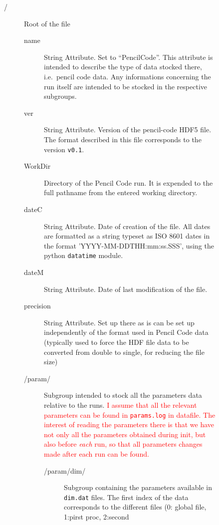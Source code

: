 \documentclass[a4paper,12pt]{article}
\newcommand{\note}[1]{\textcolor{red}{#1}}
\begin{document}
\begin{figure}[p] \centering
  \parbox{18cm}{\tiny %
    \begin{description}
    \item[/]  Root of the file
      \begin{description}
      \item[name] String Attribute. Set to ``PencilCode''. This attribute
        is intended to describe the type of data stocked there,
        i.e.\  pencil code data. Any informations concerning the run itself
    are intended to be stocked in the respective subgroups.
  \item[ver] String Attribute. Version of the
    pencil-code HDF5 file. The format described in this file
    corresponds to the version \texttt{v0.1}.
  \item[WorkDir] Directory of the Pencil Code run. It is expended to
    the full pathname from the entered working directory.
  \item[dateC] String Attribute. Date of creation of the
    file. All dates are formatted as a string typeset as ISO 8601 dates in
    the format 'YYYY-MM-DDTHH:mm:ss.SSS', using the python
    \texttt{datatime} module.
  \item[dateM] String Attribute. Date of last modification of the
    file.
  \item[precision] String Attribute. Set up there as is can be set up
    independently of the format used in Pencil Code data (typically
    used to force the HDF file data to be converted from double to
    single, for reducing the file size) 
  \item[/param/] Subgroup intended to stock all the parameters data
    relative to the runs. \note{I assume that all the relevant
      parameters can be found in \texttt{params.log} in datafile. The interest
      of reading the parameters there is that we have not only all the
      parameters obtained during init, but also before \emph{each} run,
      so that all parameters changes made after each run can be
      found.}
    \begin{description}
    \item[/param/dim/] Subgroup containing the parameters available in
      \texttt{dim.dat} files. The first index of the data corresponds
      to the different files (0: global file, 1:pirst proc, 2:second

\end{description}
\end{description}
\end{description}}
\end{figure}
\end{document}
